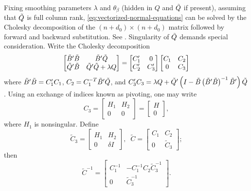 Fixing smoothing parameters $\lambda$ and $\theta_\beta$ (hidden in $Q$ and $\tilde{Q}$ if present), assuming that $\tilde{Q}$ is full column rank, \ref{eq:vectorized-normal-equations} can be solved by the Cholesky decomposition of the $\left( n + d_0 \right) \times \left( n + d_0 \right)$ matrix followed by forward and backward substitution. See \cite{golub2012matrix}. Singularity of $\tilde{Q}$ demands special consideration. Write the Cholesky decomposition
\begin{equation} \label{eq:normal-equation-cholesky}
\begin{bmatrix}
\tilde{B}'\tilde{B} & \tilde{B}'\tilde{Q} \\
\tilde{Q}'\tilde{B} & \tilde{Q}'\tilde{Q} + \lambda Q\\
\end{bmatrix}
= \begin{bmatrix}
C'_1 & 0 \\
C'_2  & C'_3 
\end{bmatrix}
\begin{bmatrix}
C_1 & C_2 \\
0  & C_3 
\end{bmatrix}
\end{equation}
\noindent
where $\tilde{B}'\tilde{B} = C'_1 C_1$, $C_2 = C_1^{-T} \tilde{B}' \tilde{Q}$, and $C'_3 C_3 = \lambda Q +  \tilde{Q}'\left( I - \tilde{B}\left( \tilde{B}' \tilde{B} \right)^{-1} \tilde{B}' \right)\tilde{Q}$. Using an exchange of indices known as pivoting, one may write 
\begin{equation*}
C_3 = \begin{bmatrix} H_1 & H_2 \\ 0 & 0 \end{bmatrix} = \begin{bmatrix} H \\  0 \end{bmatrix},
\end{equation*}
\noindent
where $H_1$ is nonsingular. Define
\begin{equation} \label{eq:cholesky-factor-mod}
\tilde{C}_3 = \begin{bmatrix}
H_1 & H_2 \\
0  & \delta I 
\end{bmatrix}, \;\;
\tilde{C} = \begin{bmatrix}
C_1 & C_2 \\
0  & \tilde{C}_3 
\end{bmatrix};
\end{equation}
\noindent
then
\begin{equation} \label{eq:cholesky-factor-mod-inverse}
\tilde{C}^{-1} = \begin{bmatrix}
C_1^{-1} & -C_1^{-1} C_2 \tilde{C}_3^{-1} \\
0  & \tilde{C}_3^{-1}
\end{bmatrix}.
\end{equation}

